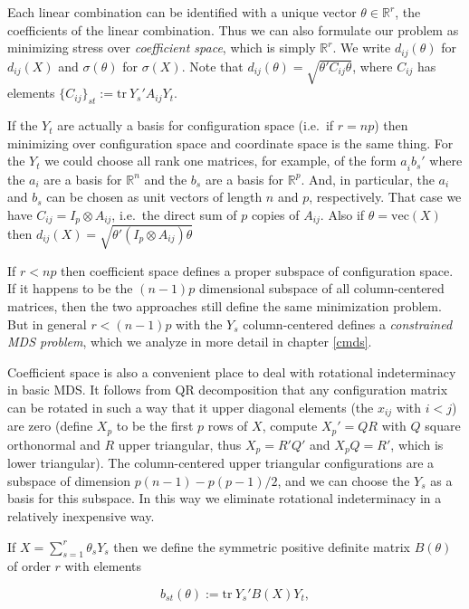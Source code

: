 \documentclass[
  12pt,
]{book}
\theoremstyle{definition}
\theoremstyle{definition}
\theoremstyle{definition}
\theoremstyle{definition}
\theoremstyle{remark}
\begin{document}
Each linear combination can be identified with a unique vector \(\theta\in\mathbb{R}^r\), the coefficients of the linear combination. Thus we can also formulate our problem as minimizing stress over \emph{coefficient space}, which is simply \(\mathbb{R}^r\). We write \(d_{ij}(\theta)\) for \(d_{ij}(X)\) and
\(\sigma(\theta)\) for \(\sigma(X)\). Note that
\(d_{ij}(\theta)=\sqrt{\theta'C_{ij}\theta}\), where
\(C_{ij}\) has elements \(\{C_{ij}\}_{st}:=\text{tr}\ Y_s'A_{ij}Y_t\).

If the \(Y_t\) are actually a basis for configuration space (i.e.~if \(r=np\)) then minimizing over configuration space and coordinate space is the same thing. For the \(Y_t\) we could choose all rank one matrices, for example, of the form \(a_i^{\ }b_s'\) where the \(a_i\) are a basis for \(\mathbb{R}^n\) and the \(b_s\) are a basis for \(\mathbb{R}^p\). And, in particular, the \(a_i\) and \(b_s\) can be chosen as unit vectors of length \(n\) and \(p\), respectively. That case we have \(C_{ij}=I_p\otimes A_{ij}\), i.e.~the direct sum of \(p\) copies of \(A_{ij}\). Also if \(\theta=\text{vec}(X)\) then \(d_{ij}(X)=\sqrt{\theta'(I_p\otimes A_{ij})\theta}\)

If \(r<np\) then coefficient space defines a proper subspace of configuration space. If it happens to be the \((n -1)p\) dimensional subspace of all column-centered matrices, then the two approaches still define the same minimization problem. But in general \(r<(n-1)p\) with the \(Y_s\) column-centered defines a \emph{constrained MDS problem}, which we analyze in more detail in chapter \ref{cmds}.

Coefficient space is also a convenient place to deal with rotational indeterminacy in basic MDS. It follows from QR decomposition that any configuration matrix can be rotated in such a way that it upper diagonal elements (the \(x_{ij}\) with \(i<j\)) are zero (define \(X_p\) to be the first \(p\) rows of \(X\), compute \(X_p'=QR\) with \(Q\) square orthonormal and \(R\) upper triangular, thus \(X_p=R'Q'\) and \(X_pQ=R'\), which is
lower triangular). The column-centered upper triangular configurations are a subspace of dimension \(p(n-1)-p(p-1)/2\), and we can choose the \(Y_s\) as a basis for this subspace. In this way we eliminate rotational indeterminacy in a relatively inexpensive way.

If \(X=\sum_{s=1}^r \theta_sY_s\) then we define the symmetric positive definite matrix \(B(\theta)\) of order \(r\) with elements

\begin{equation}
b_{st}(\theta):=\text{tr}\ Y_s'B(X)Y_t,
\label{eq:propcoefb}
\end{equation}
\end{document}
